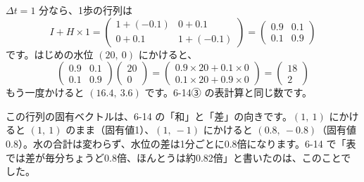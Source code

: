 $\Delta t=1$ 分なら、1歩の行列は
\[ I+H\times1=\begin{pmatrix}1+(-0.1)&0+0.1\\0+0.1&1+(-0.1)\end{pmatrix}=\begin{pmatrix}0.9&0.1\\0.1&0.9\end{pmatrix} \]
です。はじめの水位 $(20,\ 0)$ にかけると、
\[ \begin{pmatrix}0.9&0.1\\0.1&0.9\end{pmatrix}\begin{pmatrix}20\\0\end{pmatrix}=\begin{pmatrix}0.9\times20+0.1\times0\\0.1\times20+0.9\times0\end{pmatrix}=\begin{pmatrix}18\\2\end{pmatrix} \]
もう一度かけると $(16.4,\ 3.6)$ です。6-14③ の表計算と同じ数です。

この行列の固有ベクトルは、6-14 の「和」と「差」の向きです。$(1,\ 1)$ にかけると $(1,\ 1)$ のまま（固有値1）、$(1,\ -1)$ にかけると $(0.8,\ -0.8)$（固有値0.8）。水の合計は変わらず、水位の差は1分ごとに0.8倍になります。6-14 で「表では差が毎分ちょうど0.8倍、ほんとうは約0.82倍」と書いたのは、このことでした。

